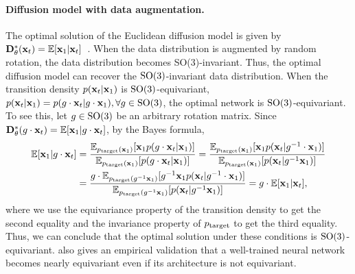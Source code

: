 \paragraph{Diffusion model with data augmentation.} The optimal solution of the Euclidean diffusion model is given by $\mathbf{D}_{\theta}^*(\mathbf{x}_t)=\mathbb{E}[\mathbf{x}_1|\mathbf{x}_t]$~\citep{song2021score,karras2022elucidating}. When the data distribution is augmented by random rotation, the data distribution becomes SO(3)-invariant. Thus, the optimal diffusion model can recover the $\mathrm{SO}(3)$-invariant data distribution. When the transition density $p(\mathbf{x}_t|\mathbf{x}_1)$ is $\mathrm{SO}(3)$-equivariant, \ie $p(\mathbf{x}_t|\mathbf{x}_1)=p(g\cdot\mathbf{x}_t|g\cdot\mathbf{x}_1),\forall g\in\mathrm{SO}(3)$, the optimal network is $\mathrm{SO}(3)$-equivariant. To see this, let $g\in\mathrm{SO}(3)$ be an arbitrary rotation matrix. Since
    $\mathbf{D}_{\theta}^*(g\cdot\mathbf{x}_t)=\mathbb{E}[\mathbf{x}_1|g\cdot\mathbf{x}_t]$,
by the Bayes formula,
\begin{align}
    \mathbb{E}[\mathbf{x}_1|g\cdot\mathbf{x}_t]&=\frac{\mathbb{E}_{p_{\mathrm{target}}(\mathbf{x}_1)}[\mathbf{x}_1p(g\cdot\mathbf{x}_t|\mathbf{x}_1)]}{\mathbb{E}_{p_{\mathrm{target}}(\mathbf{x}_1)}[p(g\cdot\mathbf{x}_t|\mathbf{x}_1)]}
    =\frac{\mathbb{E}_{p_{\mathrm{target}}(\mathbf{x}_1)}[\mathbf{x}_1p(\mathbf{x}_t|g^{-1}\cdot\mathbf{x}_1)]}{\mathbb{E}_{p_{\mathrm{target}}(\mathbf{x}_1)}[p(\mathbf{x}_t|g^{-1}\mathbf{x}_1)]}\\
    &=\frac{g\cdot\mathbb{E}_{p_{\mathrm{target}}(g^{-1}\mathbf{x}_1)}[g^{-1}\mathbf{x}_1p(\mathbf{x}_t|g^{-1}\cdot\mathbf{x}_1)]}{\mathbb{E}_{p_{\mathrm{target}}(g^{-1}\mathbf{x}_1)}[p(\mathbf{x}_t|g^{-1}\mathbf{x}_1)]}
    = g\cdot\mathbb{E}[\mathbf{x}_1|\mathbf{x}_t],
\end{align}
where we use the equivariance property of the transition density to get the second equality and the invariance property of $p_{\mathrm{target}}$ to get the third equality. Thus, we can conclude that the optimal solution under these conditions is $\mathrm{SO}(3)$-equivariant. \citet{geffner2025proteina} also gives an empirical validation that a well-trained neural network becomes nearly equivariant even if its architecture is not equivariant.


